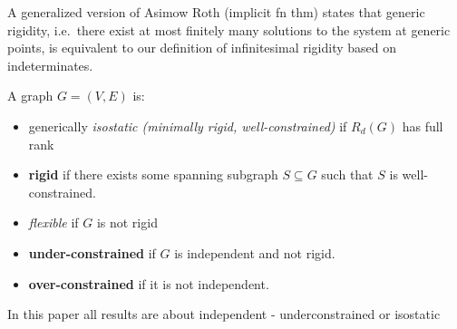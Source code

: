 
 A generalized version of Asimow Roth (implicit fn thm) states that
 generic rigidity, i.e.\ there exist at most finitely many solutions to the system at generic points,  %
  is equivalent to  our definition  of infinitesimal rigidity based on indeterminates.




A graph $G = (V,E)$ is:
\begin{itemize}
	\item generically {\it isostatic (minimally rigid, well-constrained)} if $R_d(G)$ has full rank
	\item \textbf{rigid} if there exists some spanning subgraph $S\subseteq G$ such that $S$ is well-constrained.
	\item {\it flexible} if $G$ is not rigid
    \item \textbf{under-constrained} if $G$ is independent and not rigid.
    \item \textbf{over-constrained} if it is not independent.
\end{itemize}
In this paper all results are about independent - underconstrained or
isostatic






